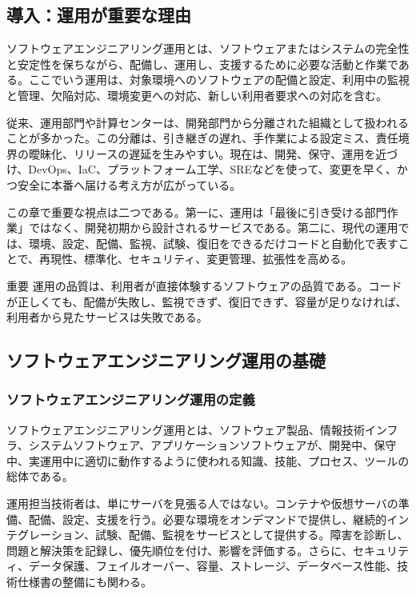 \documentclass[a4paper,11pt]{ltjsarticle}
\numberwithin{figure}{section}
\numberwithin{table}{section}
\begin{document}
\subsection*{導入：運用が重要な理由}

ソフトウェアエンジニアリング運用とは、ソフトウェアまたはシステムの完全性と安定性を保ちながら、配備し、運用し、支援するために必要な活動と作業である。ここでいう運用は、対象環境へのソフトウェアの配備と設定、利用中の監視と管理、欠陥対応、環境変更への対応、新しい利用者要求への対応を含む。

従来、運用部門や計算センターは、開発部門から分離された組織として扱われることが多かった。この分離は、引き継ぎの遅れ、手作業による設定ミス、責任境界の曖昧化、リリースの遅延を生みやすい。現在は、開発、保守、運用を近づけ、DevOps、IaC、プラットフォーム工学、SREなどを使って、変更を早く、かつ安全に本番へ届ける考え方が広がっている。

この章で重要な視点は二つである。第一に、運用は「最後に引き受ける部門作業」ではなく、開発初期から設計されるサービスである。第二に、現代の運用では、環境、設定、配備、監視、試験、復旧をできるだけコードと自動化で表すことで、再現性、標準化、セキュリティ、変更管理、拡張性を高める。

\begin{pointbox}{重要}
運用の品質は、利用者が直接体験するソフトウェアの品質である。コードが正しくても、配備が失敗し、監視できず、復旧できず、容量が足りなければ、利用者から見たサービスは失敗である。
\end{pointbox}

\subsection{ソフトウェアエンジニアリング運用の基礎}

\subsubsection{ソフトウェアエンジニアリング運用の定義}

ソフトウェアエンジニアリング運用とは、ソフトウェア製品、情報技術インフラ、システムソフトウェア、アプリケーションソフトウェアが、開発中、保守中、実運用中に適切に動作するように使われる知識、技能、プロセス、ツールの総体である。

運用担当技術者は、単にサーバを見張る人ではない。コンテナや仮想サーバの準備、配備、設定、支援を行う。必要な環境をオンデマンドで提供し、継続的インテグレーション、試験、配備、監視をサービスとして提供する。障害を診断し、問題と解決策を記録し、優先順位を付け、影響を評価する。さらに、セキュリティ、データ保護、フェイルオーバー、容量、ストレージ、データベース性能、技術仕様書の整備にも関わる。
\end{document}
